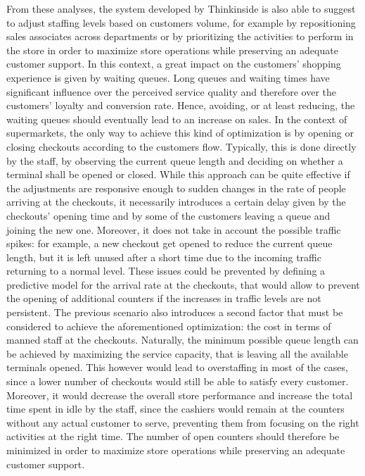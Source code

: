 From these analyses, the system developed by Thinkinside is also able to suggest to adjust staffing levels based on customers volume, for example by repositioning sales associates across departments or by prioritizing the activities to perform in the store in order to maximize store operations while preserving an adequate customer support. In this context, a great impact on the customers’ shopping experience is given by waiting queues. Long queues and waiting times have significant influence over the perceived service quality and therefore over the customers’ loyalty and conversion rate. Hence, avoiding, or at least reducing, the waiting queues should eventually lead to an increase on sales. In the context of supermarkets, the only way to achieve this kind of optimization is by opening or closing checkouts according to the customers flow. Typically, this is done directly by the staff, by observing the current queue length and deciding on whether a terminal shall be opened or closed. While this approach can be quite effective if the adjustments are responsive enough to sudden changes in the rate of people arriving at the checkouts, it necessarily introduces a certain delay given by the checkouts’ opening time and by some of the customers leaving a queue and joining the new one. Moreover, it does not take in account the possible traffic spikes: for example, a new checkout get opened to reduce the current queue length, but it is left unused after a short time due to the incoming traffic returning to a normal level. These issues could be prevented by defining a predictive model for the arrival rate at the checkouts, that would allow to prevent the opening of additional counters if the increases in traffic levels are not persistent. The previous scenario also introduces a second factor that must be considered to achieve the aforementioned optimization: the cost in terms of manned staff at the checkouts. Naturally, the minimum possible queue length can be achieved by maximizing the service capacity, that is leaving all the available terminals opened. This however would lead to overstaffing in most of the cases, since a lower number of checkouts would still be able to satisfy every customer. Moreover, it would decrease the overall store performance and increase the total time spent in idle by the staff, since the cashiers would remain at the counters without any actual customer to serve, preventing them from focusing on the right activities at the right time. The number of open counters should therefore be minimized in order to maximize store operations while preserving an adequate customer support.

